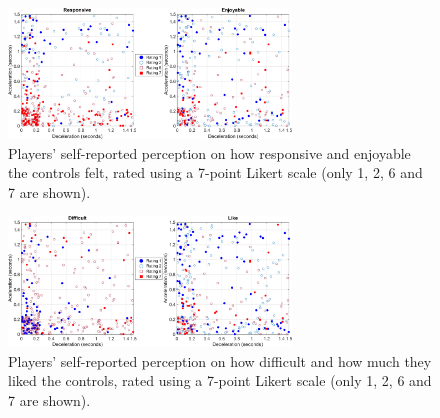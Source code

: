 \begin{figure}[htbp]
\centering
\includegraphics[width=0.67\textwidth]{Pics/Classes/Responsive_enjoyable}
\caption{Players' self-reported perception on how responsive and enjoyable the controls felt, rated using a 7-point Likert scale (only 1, 2, 6 and 7 are shown).}
\label{fig:responsive_enjoyable}
\end{figure}

\begin{figure}[htbp]
\centering
\includegraphics[width=0.67\textwidth]{Pics/Classes/difficult_like}
\caption{Players' self-reported perception on how difficult and how much they liked the controls, rated using a 7-point Likert scale (only 1, 2, 6 and 7 are shown).}
\label{fig:difficult_liked}
\end{figure}


